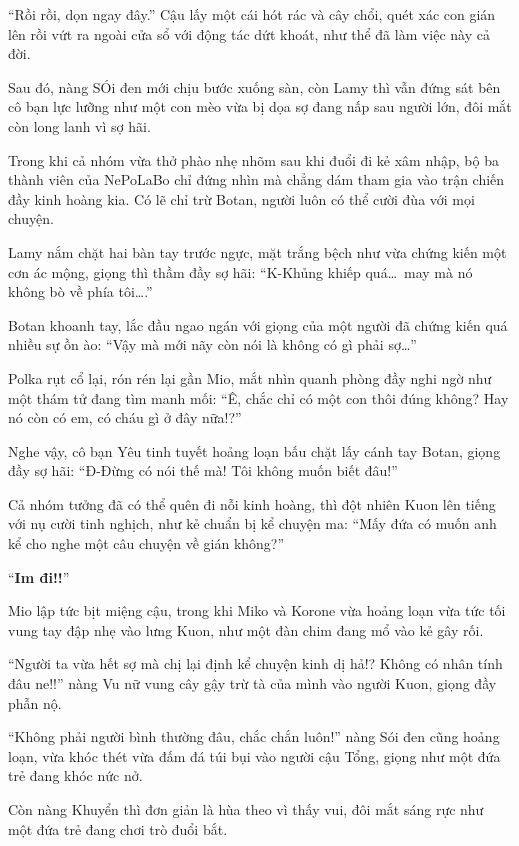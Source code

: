 \documentclass[../main.tex]{subfiles}
\begin{document}
``Rồi rồi, dọn ngay đây.'' Cậu lấy một cái hót rác và cây chổi, quét xác con gián lên rồi vứt ra ngoài cửa sổ với động tác dứt khoát, như thể đã làm việc này cả đời.

Sau đó, nàng SÓi đen mới chịu bước xuống sàn, còn Lamy thì vẫn đứng sát bên cô bạn lực lưỡng như một con mèo vừa bị dọa sợ đang nấp sau người lớn, đôi mắt còn long lanh vì sợ hãi.

Trong khi cả nhóm vừa thở phào nhẹ nhõm sau khi đuổi đi kẻ xâm nhập, bộ ba thành viên của NePoLaBo chỉ đứng nhìn mà chẳng dám tham gia vào trận chiến đầy kinh hoàng kia. Có lẽ chỉ trừ Botan, người luôn có thể cười đùa với mọi chuyện.

Lamy nắm chặt hai bàn tay trước ngực, mặt trắng bệch như vừa chứng kiến một cơn ác mộng, giọng thì thầm đầy sợ hãi: ``K-Khủng khiếp quá\dots\ may mà nó không bò về phía tôi\dots.''

Botan khoanh tay, lắc đầu ngao ngán với giọng của một người đã chứng kiến quá nhiều sự ồn ào: ``Vậy mà mới nãy còn nói là không có gì phải sợ\dots''

Polka rụt cổ lại, rón rén lại gần Mio, mắt nhìn quanh phòng đầy nghi ngờ như một thám tử đang tìm manh mối: ``Ê, chắc chỉ có một con thôi đúng không? Hay nó còn có em, có cháu gì ở đây nữa!?''

Nghe vậy, cô bạn Yêu tinh tuyết hoảng loạn bấu chặt lấy cánh tay Botan, giọng đầy sợ hãi: ``Đ-Đừng có nói thế mà! Tôi không muốn biết đâu!''

Cả nhóm tưởng đã có thể quên đi nỗi kinh hoàng, thì đột nhiên Kuon lên tiếng với nụ cười tinh nghịch, như kẻ chuẩn bị kể chuyện ma: ``Mấy đứa có muốn anh kể cho nghe một câu chuyện về gián không?''

``\textbf{Im đi!!}''

Mio lập tức bịt miệng cậu, trong khi Miko và Korone vừa hoảng loạn vừa tức tối vung tay đập nhẹ vào lưng Kuon, như một đàn chim đang mổ vào kẻ gây rối.

``Người ta vừa hết sợ mà chị lại định kể chuyện kinh dị hả!? Không có nhân tính đâu ne!!'' nàng Vu nữ vung cây gậy trừ tà của mình vào người Kuon, giọng đầy phẫn nộ.

``Không phải người bình thường đâu, chắc chắn luôn!'' nàng Sói đen cũng hoảng loạn, vừa khóc thét vừa đấm đá túi bụi vào người cậu Tổng, giọng như một đứa trẻ đang khóc nức nở.

Còn nàng Khuyển thì đơn giản là hùa theo vì thấy vui, đôi mắt sáng rực như một đứa trẻ đang chơi trò đuổi bắt.
\end{document}
